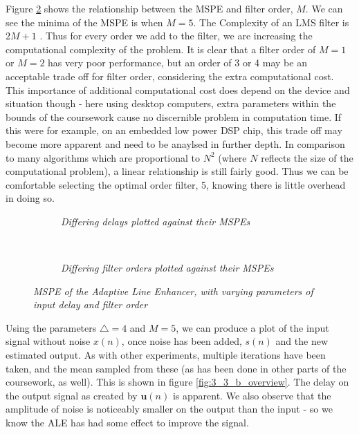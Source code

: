 \documentclass[./main.tex]{subfiles}
\begin{document}
Figure \ref{fig:3_3_b_order} shows the relationship between the MSPE and filter order, $M$. We can see the minima of the MSPE is when $M = 5$. The Complexity of an LMS filter is $ 2M + 1 $ \cite{Dhiman2013}. Thus for every order we add to the filter, we are increasing the computational complexity of the problem. It is clear that a filter order of $M = 1$ or $M=2$ has very poor performance, but an order of 3 or 4 may be an acceptable trade off for filter order, considering the extra computational cost. This importance of additional computational cost does depend on the device and situation though - here using desktop computers, extra parameters within the bounds of the coursework cause no discernible problem in computation time. If this were for example, on an embedded low power DSP chip, this trade off may become more apparent and need to be anaylsed in further depth. In comparison to many algorithms which are proportional to $ N^2 $ (where $N$ reflects the size of the computational problem), a linear relationship is still fairly good. Thus we can be comfortable selecting the optimal order filter, 5, knowing there is little overhead in doing so.

\begin{figure}[h]
	\centering
	\begin{subfigure}[b]{0.49\textwidth}
		\resizebox{\textwidth}{2in}{}
		\caption{\textit{Differing delays plotted against their MSPEs}}
		\label{fig:3_3_b_delay}
	\end{subfigure}
	~ %
	\begin{subfigure}[b]{0.49\textwidth}
		\resizebox{\textwidth}{2in}{}
		\caption{\textit{Differing filter orders plotted against their MSPEs}}
		\label{fig:3_3_b_order}
	\end{subfigure}
	
	\label{fig:3_3_b_sweeps}
	\caption{\textit{MSPE of the Adaptive Line Enhancer, with varying parameters of input delay and filter order}}
\end{figure}

Using the parameters $ \bigtriangleup = 4$ and $ M = 5$, we can produce a plot of the input signal without noise $x(n)$, once noise has been added, $s(n)$ and the new estimated output. As with other experiments, multiple iterations have been taken, and the mean sampled from these (as has been done in other parts of the coursework, as well). This is shown in figure \ref{fig:3_3_b_overview}. The delay on the output signal as created by $ \mathbf{u}(n) $ is apparent. We also observe that the amplitude of noise is noticeably smaller on the output than the input - so we know the ALE has had some effect to improve the signal.
\end{document}

